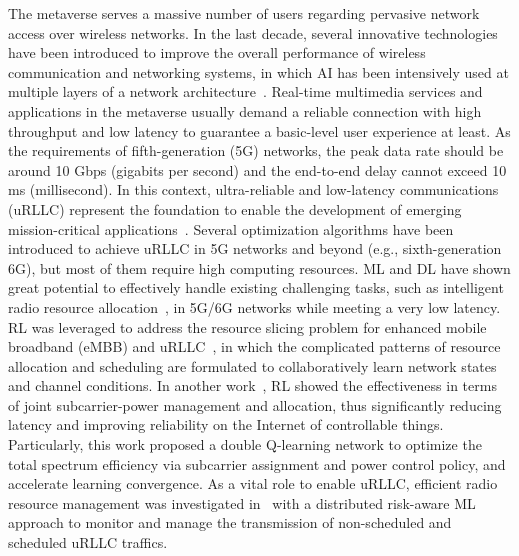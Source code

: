 \documentclass[journal]{IEEEtran}
\begin{document}
The metaverse serves a massive number of users regarding pervasive network access over wireless networks.
In the last decade, several innovative technologies have been introduced to improve the overall performance of wireless communication and networking systems, in which AI has been intensively used at multiple layers of a network architecture~\cite{chen2019artificial}.
Real-time multimedia services and applications in the metaverse usually demand a reliable connection with high throughput and low latency to guarantee a basic-level user experience at least.
As the requirements of fifth-generation (5G) networks, the peak data rate should be around 10 Gbps (gigabits per second) and the end-to-end delay cannot exceed 10 ms (millisecond). In this context, ultra-reliable and low-latency communications (uRLLC) represent the foundation to enable the development of emerging mission-critical applications~\cite{she2021atutorial}. Several optimization algorithms have been introduced to achieve uRLLC in 5G networks and beyond (e.g., sixth-generation 6G), but most of them require high computing resources. ML and DL have shown great potential to effectively handle existing challenging tasks, such as intelligent radio resource allocation~\cite{she2020deeplearning}, in 5G/6G networks while meeting a very low latency. 
RL was leveraged to address the resource slicing problem for enhanced mobile broadband (eMBB) and uRLLC~\cite{alsenwi2021intelligent}, in which the complicated patterns of resource allocation and scheduling are formulated to collaboratively learn network states and channel conditions.
In another work~\cite{gu2021deepmultiagent}, RL showed the effectiveness in terms of joint subcarrier-power management and allocation, thus significantly reducing latency and improving reliability on the Internet of controllable things.
Particularly, this work proposed a double Q-learning network to optimize the total spectrum efficiency via subcarrier assignment and power control policy, and accelerate learning convergence.
As a vital role to enable uRLLC, efficient radio resource management was investigated in~\cite{azari2019riskaware} with a distributed risk-aware ML approach to monitor and manage the transmission of non-scheduled and scheduled uRLLC traffics.
\end{document}
